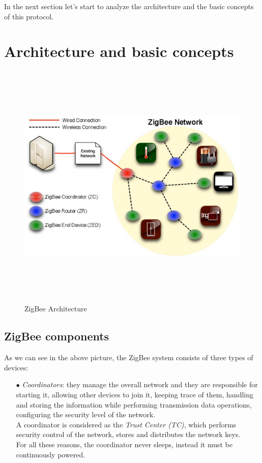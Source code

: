 \documentclass[12pt]{report}
\begin{document}
{In the next section let's start to analyze the architecture and the basic concepts of this protocol.\\

\section{Architecture and basic concepts}
\bigskip

\begin{figure}[H]
\includegraphics[width=12cm,height=12cm,keepaspectratio]{zigbee_architecture}
\centering
\caption{ZigBee Architecture}
\end{figure}

\bigskip
\subsection{ZigBee components}
\bigskip

As we can see in the above picture, the ZigBee system consists of three types of devices:

\begin{itemize}
\setlength{\itemindent}{+4mm}
\item[$\bullet$] \emph{Coordinators}: they manage the overall network and they are responsible for starting it, allowing other devices to join it, keeping trace of them, handling and storing the information while performing transmission data operations, configuring the security level of the network.\\
A coordinator is considered as the \emph{Trust Center (TC)}, which performs security control of the network, stores and distributes the network keys.\\
For all these reasons, the coordinator never sleeps, instead it must be continuously powered.



\end{itemize}}
\end{document}

